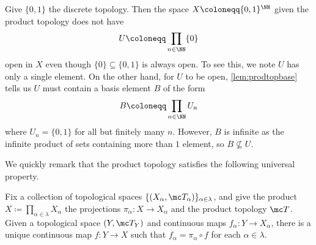 \documentclass[../notes.tex]{subfiles}
\begin{document}
\begin{example}
	Give $\{0,1\}$ the discrete topology. Then the space $X\coloneqq\{0,1\}^\NN$ given the product topology does not have
	\[U\coloneqq\prod_{n\in\NN}\{0\}\]
	open in $X$ even though $\{0\}\subseteq\{0,1\}$ is always open. To see this, we note $U$ has only a single element. On the other hand, for $U$ to be open, \autoref{lem:prodtopbase} tells us $U$ must contain a basis element $B$ of the form
	\[B\coloneqq\prod_{n\in\NN}U_n\]
	where $U_n=\{0,1\}$ for all but finitely many $n$. However, $B$ is infinite as the infinite product of sets containing more than $1$ element, so $B\not\subseteq U$.
\end{example}
We quickly remark that the product topology satisfies the following universal property.
\begin{lemma} \label{lem:produp}
	Fix a collection of topological spaces $\{(X_\alpha,\mc T_\alpha)\}_{\alpha\in\lambda}$, and give the product $X\coloneqq\prod_{\alpha\in\lambda}X_\alpha$ the projections $\pi_\alpha\colon X\to X_\alpha$ and the product topology $\mc T$. Given a topological space $(Y,\mc T_Y)$ and continuous maps $f_\alpha\colon Y\to X_\alpha$, there is a unique continuous map $f\colon Y\to X$ such that $f_\alpha=\pi_\alpha\circ f$ for each $\alpha\in\lambda$.
\end{lemma}
\end{document}

